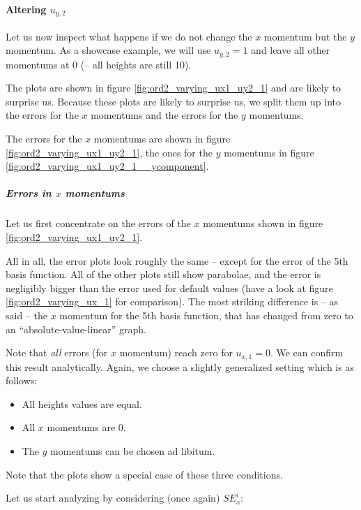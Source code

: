 \documentclass{article}
\begin{document}
\paragraph{\texorpdfstring{Altering $u_{y,2}$}{Altering uy2}}

Let us now inspect what happens if we do not change the $x$ momentum but the $y$ momentum. As a showcase example, we will use $u_{y,2}=1$ and leave all other momentums at 0 (-- all heights are still 10).

The plots are shown in figure \ref{fig:ord2_varying_ux1_uy2_1} and are likely to surprise us. Because these plots are likely to surprise us, we split them up into the errors for the $x$ momentums and the errors for the $y$ momentums.

The errors for the $x$ momentums are shown in figure \ref{fig:ord2_varying_ux1_uy2_1}, the ones for the $y$ momentums in figure \ref{fig:ord2_varying_ux1_uy2_1__ycomponent}.

\subparagraph{\texorpdfstring{Errors in $x$ momentums}{Errors in x momentums}}

Let us first concentrate on the errors of the $x$ momentums shown in figure \ref{fig:ord2_varying_ux1_uy2_1}.



All in all, the error plots look roughly the same -- except for the error of the 5th basis function. All of the other plots still show parabolae, and the error is negligibly bigger than the error used for default values (have a look at figure \ref{fig:ord2_varying_ux_1} for comparison). The most striking difference is -- as said -- the $x$ momentum for the 5th basis function, that has changed from zero to an ``absolute-value-linear'' graph.

Note that \emph{all} errors (for $x$ momentum) reach zero for $u_{x,1} = 0$. We can confirm this result analytically. Again, we choose a slightly generalized setting which is as follows:

\begin{itemize}
\item All heights values are equal.
\item All $x$ momentums are 0.
\item The $y$ momentums can be chosen ad libitum.
\end{itemize}

Note that the plots show a special case of these three conditions.

Let us start analyzing by considering (once again) $SE_x^i$:
\end{document}
